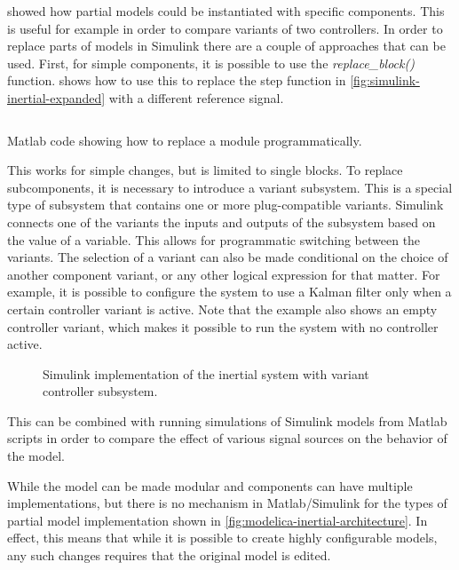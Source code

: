 \documentclass[\rootfolder/main.tex]{subfiles}
\begin{document}
 showed how partial models could be instantiated with specific components.
This is useful for example in order to compare variants of two controllers.
In order to replace parts of models in Simulink there are a couple of approaches that can be used.
First, for simple components, it is possible to use the \emph{replace\_block()} function.
 shows how to use this to replace the step function in \cref{fig:simulink-inertial-expanded} with a different reference signal.

\begin{listing}[ht]
    \inputminted{matlab}{\rootfolder/Models/Matlab/ReplaceSource.m}
    \caption{Matlab code showing how to replace a module programmatically.\label{lst:matlab-replace}}
\end{listing}

This works for simple changes, but is limited to single blocks.
To replace subcomponents, it is necessary to introduce a variant subsystem.
This is a special type of subsystem that contains one or more plug-compatible variants.
Simulink connects one of the variants the inputs and outputs of the subsystem based on the value of a variable.
This allows for programmatic switching between the variants.
The selection of a variant can also be made conditional on the choice of another component variant, or any other logical expression for that matter.
For example, it is possible to configure the system to use a Kalman filter only when a certain controller variant is active.
Note that the example also shows an empty controller variant, which makes it possible to run the system with no controller active.

\begin{figure}[ht]
    \caption{Simulink implementation of the inertial system with variant controller subsystem.\label{fig:simscape-inertial-blowup}}
\end{figure}

This can be combined with running simulations of Simulink models from Matlab scripts in order to compare the effect of various signal sources on the behavior of the model.

While the model can be made modular and components can have multiple implementations, but there is no mechanism in Matlab/Simulink for
the types of partial model implementation shown in \cref{fig:modelica-inertial-architecture}.
In effect, this means that while it is possible to create highly configurable models, any such changes requires that the original model is edited.
\end{document}
